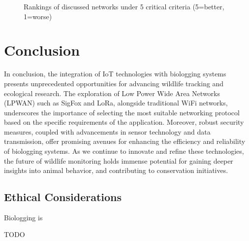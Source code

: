 \documentclass[sigplan,screen,nonacm]{acmart}
\begin{document}
\begin{figure}[htbp]
  \centering
  \caption{Rankings of discussed networks under 5 critical criteria (5=better, 1=worse)}
  \label{fig:network_barplot}
\end{figure}

\section{Conclusion}
\label{sec:Coclusion}

In conclusion, the integration of IoT technologies with biologging systems presents unprecedented opportunities for 
advancing wildlife tracking and ecological research. The exploration of Low Power Wide Area Networks (LPWAN) such 
as SigFox and LoRa, alongside traditional WiFi networks, underscores the importance of selecting the most suitable 
networking protocol based on the specific requirements of the application. Moreover, robust security measures, coupled 
with advancements in sensor technology and data transmission, offer promising avenues for enhancing the efficiency 
and reliability of biologging systems. As we continue to innovate and refine these technologies, the future of 
wildlife monitoring holds immense potential for gaining deeper insights into animal behavior, and contributing to 
conservation initiatives.

\subsection{Ethical Considerations}
\label{sec:Ethical Considerations}

Biologging is

\begin{acks}
  TODO
\end{acks}



\end{document}
